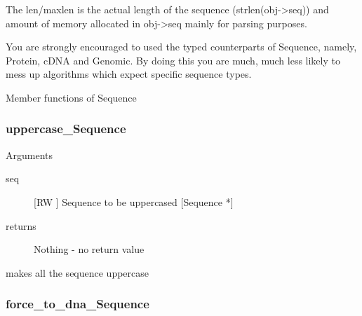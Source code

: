 The len/maxlen is the actual length
of the sequence (strlen(obj->seq)) and
amount of memory allocated in obj->seq 
mainly for parsing purposes.


You are strongly encouraged to used the
typed counterparts of Sequence, namely,
Protein, cDNA and Genomic. By doing this 
you are much, much less likely to
mess up algorithms which expect specific
sequence types. 




Member functions of Sequence

\subsubsection{uppercase_Sequence}

Arguments
\begin{description}
\item[seq] [RW   ] Sequence to be uppercased [Sequence *]
\item[returns] Nothing - no return value
\end{description}
makes all the sequence uppercase


\subsubsection{force_to_dna_Sequence}

